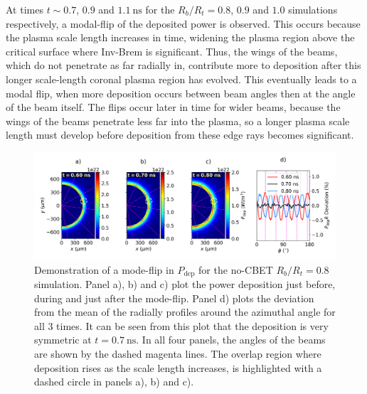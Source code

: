 At times $t\sim0.7$, $0.9$ and $1.1\ \text{ns}$ for the $R_b/R_t=0.8$, $0.9$ and $1.0$ simulations respectively, a modal-flip of the deposited power is observed.
This occurs because the plasma scale length increases in time, widening the plasma region above the critical surface where \ac{Inv-Brem} is significant.
Thus, the wings of the beams, which do not penetrate as far radially in, contribute more to deposition after this longer scale-length coronal plasma region has evolved.
This eventually leads to a modal flip, when more deposition occurs between beam angles then at the angle of the beam itself.
The flips occur later in time for wider beams, because the wings of the beams penetrate less far into the plasma, so a longer plasma scale length must develop before deposition from these edge rays becomes significant.

\begin{figure}[t!]
    \includegraphics[width=\linewidth]{Results1/Images/NoCBET_modeflip.png}
    \centering
    \caption{Demonstration of a mode-flip in $P_{\text{dep}}$ for the no-\ac{CBET} $R_b/R_t=0.8$ simulation.
    Panel a), b) and c) plot the power deposition just before, during and just after the mode-flip.
    Panel d) plots the deviation from the mean of the radially profiles around the azimuthal angle for all 3 times.
    It can be seen from this plot that the deposition is very symmetric at $t=0.7\ \text{ns}$.
    In all four panels, the angles of the beams are shown by the dashed magenta lines.
    The overlap region where deposition rises as the scale length increases, is highlighted with a dashed circle in panels a), b) and c).}%
    \label{fig:Res1_Deposition_change}
\end{figure}

